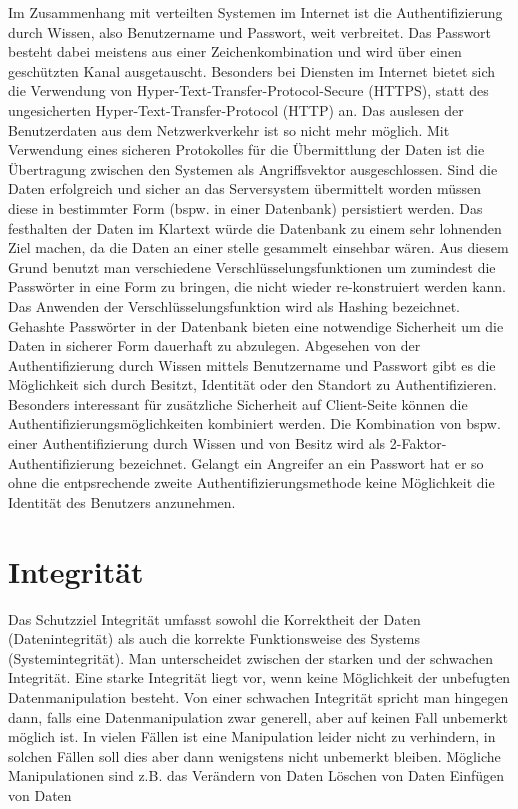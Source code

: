 Im Zusammenhang mit verteilten Systemen im Internet ist die Authentifizierung durch Wissen,
also Benutzername und Passwort, weit verbreitet. 
Das Passwort besteht dabei meistens aus einer Zeichenkombination und wird über einen geschützten Kanal ausgetauscht. 
Besonders bei Diensten im Internet bietet sich die Verwendung von Hyper-Text-Transfer-Protocol-Secure (HTTPS), statt
des ungesicherten Hyper-Text-Transfer-Protocol (HTTP) an.
Das auslesen der Benutzerdaten aus dem Netzwerkverkehr ist so nicht mehr möglich. 
Mit Verwendung eines sicheren Protokolles für die Übermittlung der Daten ist die Übertragung zwischen den Systemen 
als Angriffsvektor ausgeschlossen. 
Sind die Daten erfolgreich und sicher an das Serversystem übermittelt worden müssen diese in bestimmter Form 
(bspw. in einer Datenbank) persistiert werden. 
Das festhalten der Daten im Klartext würde die Datenbank zu einem sehr lohnenden Ziel machen, da die Daten 
an einer stelle gesammelt einsehbar wären. 
Aus diesem Grund benutzt man verschiedene Verschlüsselungsfunktionen um zumindest die Passwörter in eine Form zu bringen,
die nicht wieder re-konstruiert werden kann. Das Anwenden der Verschlüsselungsfunktion wird 
als Hashing bezeichnet. Gehashte Passwörter in der Datenbank bieten eine notwendige Sicherheit um die Daten in sicherer Form 
dauerhaft zu abzulegen. Abgesehen von der Authentifizierung durch Wissen mittels Benutzername und Passwort gibt es die Möglichkeit sich durch 
Besitzt, Identität oder den Standort zu Authentifizieren. 
Besonders interessant für zusätzliche Sicherheit auf Client-Seite können die 
Authentifizierungsmöglichkeiten kombiniert werden. Die Kombination von bspw. einer Authentifizierung durch Wissen und von Besitz 
wird als 2-Faktor-Authentifizierung bezeichnet. Gelangt ein Angreifer an ein Passwort hat er so ohne die entpsrechende zweite 
Authentifizierungsmethode keine Möglichkeit die Identität des Benutzers anzunehmen. 

\section{Integrität}

Das Schutzziel Integrität umfasst sowohl die Korrektheit der Daten (Datenintegrität) 
als auch die korrekte Funktionsweise des Systems (Systemintegrität). 
Man unterscheidet zwischen der starken und der schwachen Integrität. 
Eine starke Integrität liegt vor, wenn keine Möglichkeit der unbefugten Datenmanipulation besteht. 
Von einer schwachen Integrität spricht man hingegen dann, falls eine Datenmanipulation zwar generell, 
aber auf keinen Fall unbemerkt möglich ist. In vielen Fällen ist eine Manipulation leider nicht zu verhindern, 
in solchen Fällen soll dies aber dann wenigstens nicht unbemerkt bleiben. 
Mögliche Manipulationen sind z.B. das
Verändern von Daten
Löschen von Daten
Einfügen von Daten

